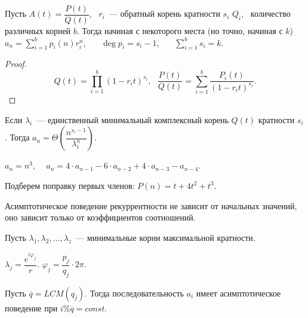 \begin{theorem}
    Пусть $A(t) = \dfrac{P(t)}{Q(t)}$, ~$r_i$~--- обратный корень кратности $s_i$ $Q_i$, ~количество различных корней $b$.
    Тогда начиная с некоторого места (но точно, начиная с $k$) $a_n = \sum_{i = 1}^b p_i(n) r_i^n$, ~~~$\deg p_i = s_i - 1$,~~~
    $\sum_{i=1}^b s_i = k$.  
\end{theorem}

\begin{proof}
    \[ Q(t) = \prod_{i=1}^b \left( 1 - r_i t \right) ^{s_i},~~~
    \dfrac{P(t)}{Q(t)} = \sum_{i = 1} ^b \dfrac{P_i(t)}{(1 - r _it  ) ^{s_i}}.
    \]
\end{proof}

Если $\lambda_i$~--- единственный минимальный комплексный корень $Q(t)$ кратности $s_i$.
Тогда $a_n = \Theta \left( \dfrac{n^{s_i - 1}}{\lambda_i^n} \right)$.

\begin{example}
    $a_n = n^3$,~~ $a_n = 4 \cdot a_{n-1} - 6 \cdot a_{n -2} +
     4 \cdot a_{n - 3} - a_{n-4}$.
     
     Подберем поправку первых членов: $P(n) = t + 4t^2 + t^3$.
\end{example}

\begin{statement}
Асимптотическое поведение рекуррентности не зависит от начальных значений, оно зависит только от коэффициентов соотношений.
\end{statement}
   
\begin{statement}
    Пусть $\lambda_1, \lambda_2, \dots, \lambda_z$~--- минимальные корни максимальной кратности.

    $\lambda_j = \dfrac{e^{i \varphi_j}}{r}$. $\varphi_j = \dfrac{p_j}{q_j} \cdot 2\pi$.

    Пусть $\overline{q} = LCM(q_j)$. Тогда последовательность $a_i$ имеет асимптотическое поведение при $i \% \overline{q} = const$.
\end{statement}


\endinput